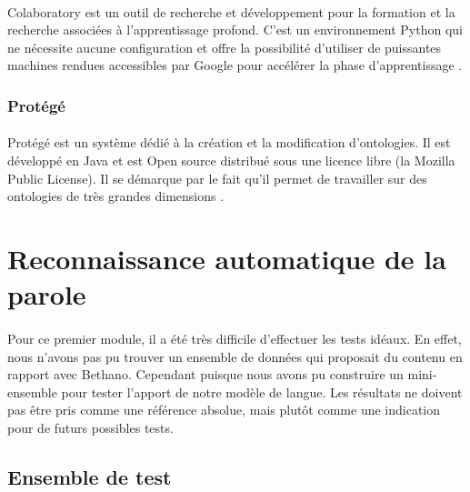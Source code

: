 		\paragraph{}
		Colaboratory est un outil de recherche et développement pour la formation et la recherche associées à l'apprentissage profond. C'est un environnement Python qui ne nécessite aucune configuration et offre la possibilité d'utiliser de puissantes machines rendues accessibles par Google pour accélérer la phase d'apprentissage \cite{colab}.
		
		\subsubsection*{Protégé}
		\paragraph{}
		Protégé est un système dédié à la création et la modification d'ontologies. Il est développé en Java et est Open source distribué sous une licence libre (la Mozilla Public License). Il se démarque par le fait qu'il permet de travailler sur des ontologies de très grandes dimensions 
		\cite{protege}.
		
		
\section{Reconnaissance automatique de la parole}
\paragraph{}
Pour ce premier module, il a été très difficile d'effectuer les tests idéaux. En effet, nous n'avons pas pu trouver un ensemble de données qui proposait du contenu en rapport avec Bethano. Cependant puisque nous avons pu construire un mini-ensemble pour tester l'apport de notre modèle de langue. Les résultats ne doivent pas être pris comme une référence absolue, mais plutôt comme une indication pour de futurs possibles tests.
	\subsection{Ensemble de test}
